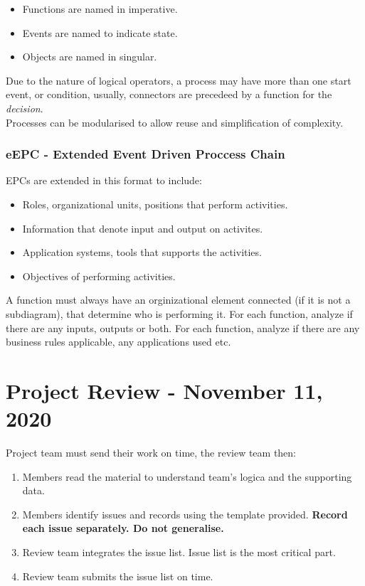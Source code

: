 \documentclass[11pt,a4paper,twocolumn]{book}
\begin{document}
\begin{itemize}
\item Functions are named in imperative.
\item Events are named to indicate state.
\item Objects are named in singular.
\end{itemize}

Due to the nature of logical operators, a process may have more than one start event, or condition, usually, connectors are precedeed by a function for the \textit{decision}.\\

Processes can be modularised to allow reuse and simplification of complexity.

\subsection{eEPC - Extended Event Driven Proccess Chain}

EPCs are extended in this format to include:

\begin{itemize}
\item Roles, organizational units, positions that perform activities.
\item Information that denote input and output on activites.
\item Application systems, tools that supports the activities.
\item Objectives of performing activities.
\end{itemize}

A function must always have an orginizational element connected (if it is not a subdiagram), that determine who is performing it. For each function, analyze if there are any inputs, outputs or both. For each function, analyze if there are any business rules applicable, any applications used etc.

\chapter{Project Review - November 11, 2020}

Project team must send their work on time, the review team then:

\begin{enumerate}
\item Members read the material to understand team's logica and the supporting data.
\item Members identify issues and records using the template provided. \textbf{Record each issue separately. Do not generalise.}
\item Review team integrates the issue list. Issue list is the most critical part.
\item Review team submits the issue list on time.
\end{enumerate}
\end{document}
